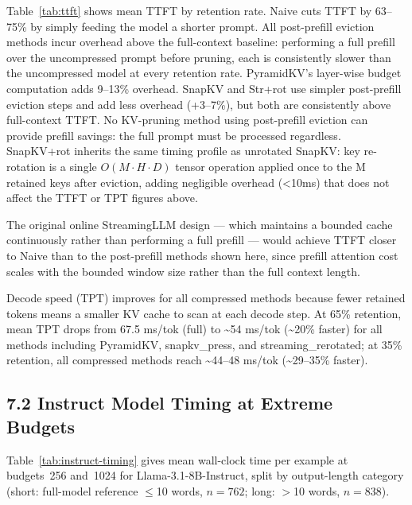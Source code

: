 \documentclass[10pt,letterpaper]{article}
\begin{document}
Table~\ref{tab:ttft} shows mean TTFT by retention rate.
Naive cuts TTFT by 63--75\% by simply feeding the model a shorter
prompt. All post-prefill eviction methods incur overhead above the
full-context baseline: performing a full prefill over the uncompressed
prompt before pruning, each is consistently slower than the uncompressed
model at every retention rate. PyramidKV's layer-wise budget computation
adds 9--13\% overhead. SnapKV and Str+rot use simpler
post-prefill eviction steps and add less overhead (+3--7\%), but both
are consistently above full-context TTFT. No KV-pruning method using
post-prefill eviction can provide prefill savings: the full prompt must
be processed regardless. SnapKV+rot inherits the same timing profile as
unrotated SnapKV: key re-rotation is a single \(O(M \cdot H \cdot D)\)
tensor operation applied once to the M retained keys after eviction,
adding negligible overhead (\textless10ms) that does not affect the TTFT
or TPT figures above.

The original online StreamingLLM design --- which
maintains a bounded cache continuously rather than performing a full
prefill --- would achieve TTFT closer to Naive than to the post-prefill
methods shown here, since prefill attention cost scales with the bounded
window size rather than the full context length.

Decode speed (TPT) improves for all compressed methods because
fewer retained tokens means a smaller KV cache to scan at each decode
step. At 65\% retention, mean TPT drops from 67.5 ms/tok (full) to
\textasciitilde54 ms/tok (\textasciitilde20\% faster) for all methods
including PyramidKV, snapkv\_press, and streaming\_rerotated; at 35\%
retention, all compressed methods reach \textasciitilde44--48 ms/tok
(\textasciitilde29--35\% faster).

\subsection{7.2 Instruct Model Timing at Extreme Budgets}\label{instruct-model-timing}

Table~\ref{tab:instruct-timing} gives mean wall-clock time per example at budgets~256 and~1024 for Llama-3.1-8B-Instruct, split by output-length category (short: full-model reference $\leq$10 words, $n=762$; long: $>$10 words, $n=838$).
\end{document}
